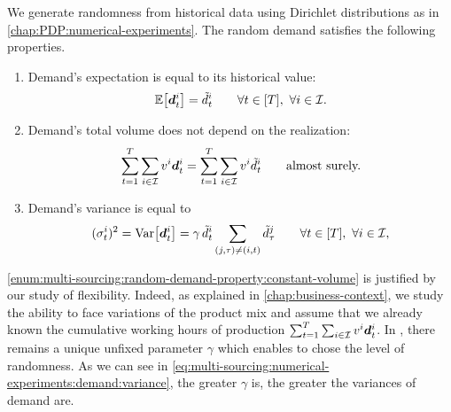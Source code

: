 We generate randomness from historical data using Dirichlet distributions as in \cref{chap:PDP:numerical-experiments}.
The random demand satisfies the following properties.
\begin{enumerate}
  \item\label{enum:multi-sourcing:random-demand-property:expectation} Demand's expectation is equal to its historical value:
  \begin{equation}
    \espe\sqbracket{\va\demand_t^i} = \tilde{\demand}_t^i\qquad\forall t\in\range{T},\ \forall i\in\REF.
  \end{equation}
  \item\label{enum:multi-sourcing:random-demand-property:constant-volume} Demand's total volume does not depend on the realization:
  \begin{equation}
    \sum_{t=1}^{\horizon}\sum_{i\in\REF}\rate^i\va\demand_t^i = \sum_{t=1}^{\horizon}\sum_{i\in\REF}\rate^i\tilde{\demand}_t^i\qquad\mbox{almost surely.}
  \end{equation}
  \item\label{enum:multi-sourcing:random-demand-property:variance} Demand's variance is equal to
  \begin{equation}\label{eq:multi-sourcing:numerical-experiments:demand:variance}
    (\sigma_t^i)^2=\vari\sqbracket{\va\demand_t^i}=\gamma\,\tilde{\demand}_t^i\sum_{\bracket{j,\tau}\ne\bracket{i,t}}\tilde{\demand}_{\tau}^j\qquad\forall t\in\range{T},\ \forall i\in\REF,
  \end{equation}
\end{enumerate}


\cref{enum:multi-sourcing:random-demand-property:constant-volume} is justified by our study of flexibility.
Indeed, as explained in \cref{chap:business-context}, we study the ability to face variations of the product mix and assume that we already known the cumulative working hours of production $\sum_{t=1}^{\horizon}\sum_{i\in\REF}\rate^i\va\demand_t^i$.
In \label{enum:multi-sourcing:random-demand-property:variance}, there remains a unique unfixed parameter $\gamma$ which enables to chose the level of randomness. As we can see in \cref{eq:multi-sourcing:numerical-experiments:demand:variance}, the greater $\gamma$ is, the greater the variances of demand are.





